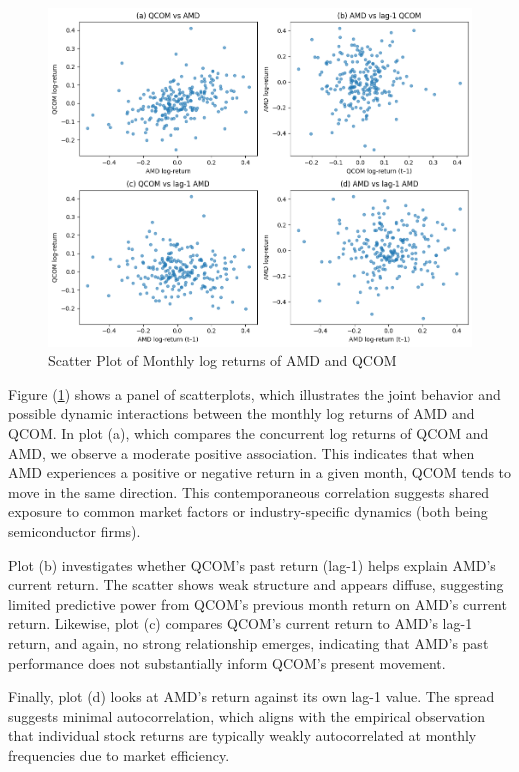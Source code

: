 \documentclass[12pt]{article}
\begin{document}
\begin{figure}[!h]
	\centering
	\includegraphics[width=0.8\linewidth]{plots/amd_qcom_scatter.png}
	\caption{Scatter Plot of Monthly log returns of AMD and QCOM}
	\label{fig:amd_qcom_scatter}
\end{figure}

Figure (\ref{fig:amd_qcom_scatter}) shows a panel of scatterplots, which illustrates the joint behavior and possible dynamic interactions between the monthly log returns of AMD and QCOM. In plot (a), which compares the concurrent log returns of QCOM and AMD, we observe a moderate positive association. This indicates that when AMD experiences a positive or negative return in a given month, QCOM tends to move in the same direction. This contemporaneous correlation suggests shared exposure to common market factors or industry-specific dynamics (both being semiconductor firms).

Plot (b) investigates whether QCOM’s past return (lag-1) helps explain AMD’s current return. The scatter shows weak structure and appears diffuse, suggesting limited predictive power from QCOM’s previous month return on AMD's current return. Likewise, plot (c) compares QCOM’s current return to AMD’s lag-1 return, and again, no strong relationship emerges, indicating that AMD’s past performance does not substantially inform QCOM’s present movement.

Finally, plot (d) looks at AMD's return against its own lag-1 value. The spread suggests minimal autocorrelation, which aligns with the empirical observation that individual stock returns are typically weakly autocorrelated at monthly frequencies due to market efficiency.

\newpage
\end{document}

